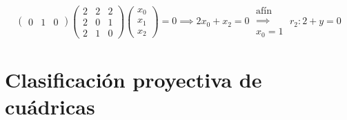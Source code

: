\begin{example}
\begin{itemize}
            \[
                \begin{pmatrix}
                    0 & 1 & 0
                \end{pmatrix}
                \begin{pmatrix}
                    2 & 2 & 2 \\
                    2 & 0 & 1 \\
                    2 & 1 & 0
                \end{pmatrix}
                \begin{pmatrix}
                    x_0 \\ x_1 \\ x_2
                \end{pmatrix}
                = 0 \implies 2x_0 + x_2 = 0 \; \substack{\text{afín} \\ \implies \\ x_0 = 1}\; r_2 \colon 2 + y = 0
            \]
    \end{itemize}
\end{example}

\section{Clasificación proyectiva de cuádricas}

